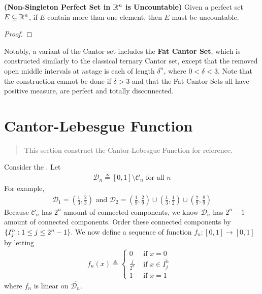 \documentclass{report}
\begin{document}
\begin{theorem}
\label{NSP}
\textbf{(Non-Singleton Perfect Set in $\mathbb{R}^n$ is Uncountable)} Given a perfect set $E\subseteq \mathbb{R}^n$, if $E$ contain more than one element, then  $E$ must be uncountable.
\end{theorem}
\begin{proof}

\end{proof}
\begin{mdframed}
Notably, a variant of the Cantor set includes the \textbf{Fat Cantor Set}, which is constructed similarly to the classical ternary Cantor set, except that the removed open middle intervals at $n$stage is each of length $\delta^n$, where $0 < \delta < 3$. Note that the construction cannot be done if $\delta > 3$ and that the Fat Cantor Sets all have positive measure, are perfect and totally disconnected.  
\end{mdframed}
\section{Cantor-Lebesgue Function}
\label{Cantor-Lebesgue Function}
\begin{abstract}
This section construct the Cantor-Lebesgue Function for reference.
\end{abstract}
\begin{mdframed}
Consider the . Let 
\begin{align*}
\mathcal{D}_n \triangleq [0,1]\setminus \mathcal{C}_n\text{ for all }n
\end{align*}
For example,
\begin{align*}
\mathcal{D}_1=(\frac{1}{3},\frac{2}{3})\text{ and }\mathcal{D}_2= (\frac{1}{9},\frac{2}{9})\cup (\frac{1}{3},\frac{1}{2})\cup  (\frac{7}{9},\frac{8}{9})
\end{align*}
Because $\mathcal{C}_n$ has $2^n$ amount of connected components, we know  $\mathcal{D}_n$ has $2^n-1$ amount of connected components. Order these connected components by  $\{ I^n_j: 1\leq j\leq 2^n-1 \}$. We now define a sequence of function $f_n:[0,1]\rightarrow [0,1]$ by letting 
\begin{align*}
f_n(x)\triangleq \begin{cases}
0& \text{ if $x=0$ }\\
\frac{j}{2^n}& \text{ if $x\in \overline{I_j^n}$ }\\
1& \text{ if $x=1$ }
\end{cases}
\end{align*}
where $f_n$ is linear on  $\overline{\mathcal{D}_n}$. 
\end{mdframed}
\end{document}
